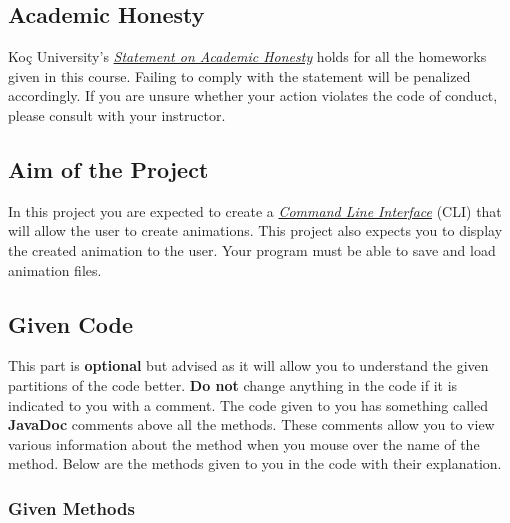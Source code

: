 \documentclass[a4paper]{article}
\begin{document}
	\subsection{Academic Honesty}
	Koç University's \emph{\href{https://vpaa.ku.edu.tr/sites/vpaa.ku.edu.tr/files/Misc_Documents/Statement_on_Academic_Honesty.pdf}{Statement on Academic Honesty}} holds for all the homeworks given in this course. Failing to comply with the statement will be penalized accordingly. If you are unsure whether your action violates the code of conduct, please consult with your instructor.
	
	\subsection{Aim of the Project}
	In this project you are expected to create a \emph{\href{https://en.wikipedia.org/wiki/Command-line_interface}{Command Line Interface}} (CLI) that will allow the user to create animations. This project also expects you to display the created animation to the user. Your program must be able to save and load animation files.
	
	\subsection{Given Code}
	This part is \textbf{optional} but advised as it will allow you to understand the given partitions of the code better. \textbf{Do not} change anything in the code if it is indicated to you with a comment. The code given to you has something called \textbf{JavaDoc} comments above all the methods. These comments allow you to view various information about the method when you mouse over the name of the method. Below are the methods given to you in the code with their explanation.
	
	\subsubsection{Given Methods}
	
\end{document}
